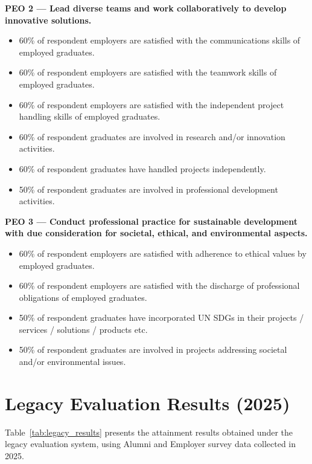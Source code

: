 \noindent\textbf{PEO 2 --- Lead diverse teams and work collaboratively to develop innovative solutions.}
\begin{itemize}[leftmargin=1.5em,topsep=2pt]
\item 60\% of respondent employers are satisfied with the communications skills of employed graduates.
\item 60\% of respondent employers are satisfied with the teamwork skills of employed graduates.
\item 60\% of respondent employers are satisfied with the independent project handling skills of employed graduates.
\item 60\% of respondent graduates are involved in research and/or innovation activities.
\item 60\% of respondent graduates have handled projects independently.
\item 50\% of respondent graduates are involved in professional development activities.
\end{itemize}

\noindent\textbf{PEO 3 --- Conduct professional practice for sustainable development with due consideration for societal, ethical, and environmental aspects.}
\begin{itemize}[leftmargin=1.5em,topsep=2pt]
\item 60\% of respondent employers are satisfied with adherence to ethical values by employed graduates.
\item 60\% of respondent employers are satisfied with the discharge of professional obligations of employed graduates.
\item 50\% of respondent graduates have incorporated UN SDGs in their projects / services / solutions / products etc.
\item 50\% of respondent graduates are involved in projects addressing societal and/or environmental issues.
\end{itemize}

\section{Legacy Evaluation Results (2025)}

Table~\ref{tab:legacy_results} presents the attainment results obtained under the legacy evaluation system, using Alumni and Employer survey data collected in 2025.

